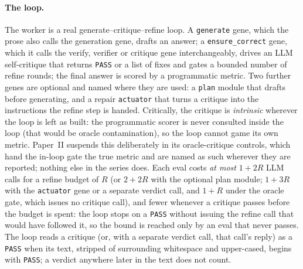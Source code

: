 %

\paragraph{The loop.}
The worker is a real generate--critique--refine loop. A \texttt{generate} gene, which the prose also calls the
generation gene, drafts an answer; a \texttt{ensure\_correct} gene, which it calls the
verify, verifier or critique gene interchangeably, drives an LLM
self-critique that returns \texttt{PASS} or a list of fixes and gates a bounded
number of refine rounds; the final answer is scored by a programmatic metric. Two further
genes are optional and named where they are used: a \texttt{plan} module that drafts before
generating, and a repair \texttt{actuator} that turns a critique into the instructions the
refine step is handed.
Critically, the critique is \emph{intrinsic} wherever the loop is left as built: the
programmatic scorer is never consulted inside the loop (that would be oracle contamination), so
the loop cannot game its own metric. Paper~II suspends this deliberately in its oracle-critique
controls, which hand the in-loop gate the true metric and are named as such wherever they are
reported; nothing else in the series does.
Each eval costs \emph{at most} $1 + 2R$ LLM calls for a refine
budget of $R$ (or $2 + 2R$ with the optional plan module; $1 + 3R$ with the \texttt{actuator} gene or a
separate verdict call, and $1 + R$ under the oracle gate, which issues no critique call), and fewer whenever a critique passes
before the budget is spent: the loop stops on a \texttt{PASS} without issuing the refine call
that would have followed it, so the bound is reached only by an eval that never passes. The loop
reads a critique (or, with a separate verdict call, that call's reply) as a \texttt{PASS} when its text, stripped of surrounding whitespace and
upper-cased, begins with \texttt{PASS}; a verdict anywhere later in the text does not count.

